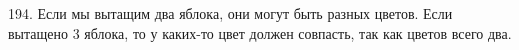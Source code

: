 194. Если мы вытащим два яблока, они могут быть разных цветов. Если вытащено 3 яблока, то у каких-то цвет должен совпасть, так как цветов всего два.\\
